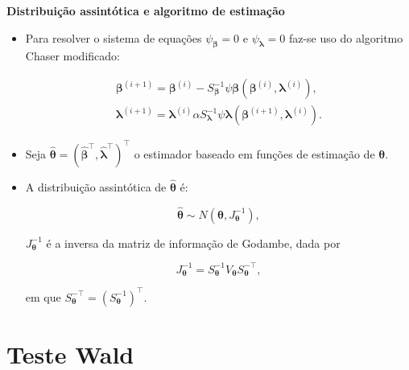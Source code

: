 \documentclass[10pt,
  aspectratio=169,
  serif,
  mathserif,
  professionalfont,
  compress,
  handout,
  ]{beamer}\usepackage[]{graphicx}\usepackage[]{color}
\begin{document}

\begin{frame}[c, allowframebreaks]

\textbf{Distribuição assintótica e algoritmo de estimação}

\begin{itemize}

  \item Para resolver o sistema de equações $\psi_{\boldsymbol{\beta}} = 0$ e $\psi_{\boldsymbol{\lambda}} = 0$ faz-se uso do algoritmo Chaser modificado:

$$
\begin{matrix}
\boldsymbol{\beta}^{(i+1)} = \boldsymbol{\beta}^{(i)}- S_{\boldsymbol{\beta}}^{-1} \psi \boldsymbol{\beta} (\boldsymbol{\beta}^{(i)}, \boldsymbol{\lambda}^{(i)}), \\ 
\boldsymbol{\lambda}^{(i+1)} = \boldsymbol{\lambda}^{(i)}\alpha S_{\boldsymbol{\lambda}}^{-1} \psi \boldsymbol{\lambda} (\boldsymbol{\beta}^{(i+1)}, \boldsymbol{\lambda}^{(i)}).
\end{matrix}
$$

  \item Seja $\boldsymbol{\hat{\theta}} = (\boldsymbol{\hat{\beta}^{\top}}, \boldsymbol{\hat{\lambda}^{\top}})^{\top}$ o estimador baseado em funções de estimação de $\boldsymbol{\theta}$.
  
  \item A distribuição assintótica de $\boldsymbol{\hat{\theta}}$ é:

$$
\boldsymbol{\hat{\theta}} \sim N(\boldsymbol{\theta}, J_{\boldsymbol{\theta}}^{-1}),
$$

\noindent $J_{\boldsymbol{\theta}}^{-1}$ é a inversa da matriz de informação de Godambe, dada por
  
$$J_{\boldsymbol{\theta}}^{-1} = S_{\boldsymbol{\theta}}^{-1} V_{\boldsymbol{\theta}} S_{\boldsymbol{\theta}}^{-\top},$$ 

\noindent em que $S_{\boldsymbol{\theta}}^{-\top} = (S_{\boldsymbol{\theta}}^{-1})^{\top}.$

\end{itemize}

\end{frame}


\section{Teste Wald}
\end{document}
